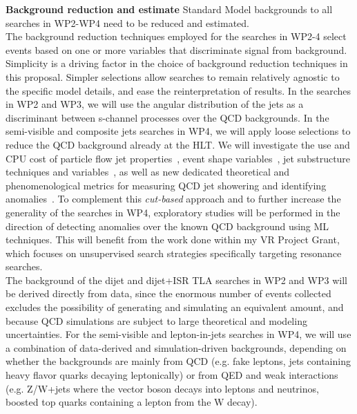 \textbf{Background reduction and estimate}
Standard Model backgrounds to all searches in WP2-WP4 need to be reduced and estimated. \\
\noindent
The background reduction techniques employed for the searches in WP2-4 select events based on one or more variables that discriminate signal from background.
Simplicity is a driving factor in the choice of background reduction techniques in this proposal. 
Simpler selections allow searches to remain relatively agnostic to the specific model details, and ease the reinterpretation of results.
In the searches in WP2 and WP3, we will use the angular distribution of the jets as a discriminant between s-channel processes over the QCD backgrounds. 
In the semi-visible and composite jets searches in WP4, we will apply loose selections to reduce the QCD background already at the HLT. 
We will investigate the use and CPU cost of particle flow jet properties~\cite{ToBeCited}, %
event shape variables~\cite{ToBeCited}, %
jet substructure techniques and variables~\cite{ToBeCited}, %
as well as new dedicated theoretical and phenomenological metrics for measuring QCD jet showering and identifying anomalies~\cite{ToBeCited}. %
To complement this \textit{cut-based} approach and to further increase the generality of the searches in WP4, exploratory studies will be performed in the direction of detecting anomalies over the known QCD background using ML techniques. %
This will benefit from the work done within my VR Project Grant, which focuses on unsupervised search strategies specifically targeting resonance searches.
\\
\noindent
The background of the dijet and dijet+ISR TLA searches in WP2 and WP3 will be derived directly from data, since the enormous number of events collected excludes the possibility of generating and simulating an equivalent amount, and because QCD simulations are subject to large theoretical and modeling uncertainties.  
For the semi-visible and lepton-in-jets searches in WP4, we will use a combination of data-derived and simulation-driven backgrounds, depending on whether the backgrounds are mainly from QCD (e.g. fake leptons, jets containing heavy flavor quarks decaying leptonically) or from QED and weak interactions (e.g. Z/W+jets where the vector boson decays into leptons and neutrinos, boosted top quarks containing a lepton from the W decay). 
